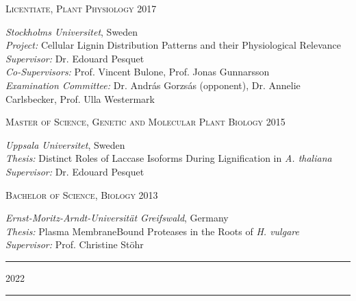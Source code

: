 \documentclass[11pt]{article}
\newcommand*{\xdash}[1][3em]{\rule[0.5ex]{#1}{0.55pt}}
\begin{document}
\begin{addmargin}[15pt]{0pt}
\textsc{\large{Licentiate, Plant Physiology} \hfill \textsc{2017}}
\end{addmargin}
\begin{addmargin}[24pt]{0pt}
	\textit{Stockholms Universitet}, Sweden \\
	\textit{Project:} Cellular Lignin Distribution Patterns and their Physiological Relevance \\
	\textit{Supervisor:} Dr. Edouard Pesquet \\
	\textit{Co-Supervisors:} Prof. Vincent Bulone, Prof. Jonas Gunnarsson\\
	\textit{Examination Committee:} Dr. András Gorzsás (opponent), Dr. Annelie Carlsbecker, Prof. Ulla Westermark
\end{addmargin}
\vspace{0.2cm}

\begin{addmargin}[15pt]{0pt}
\textsc{\large{Master of Science, Genetic and Molecular Plant Biology} \hfill \textsc{2015}}
\end{addmargin}
\begin{addmargin}[24pt]{0pt}
	\textit{Uppsala Universitet}, Sweden \\
	\textit{Thesis:} Distinct Roles of Laccase Isoforms During Lignification in \textit{ A. thaliana}\\
	\textit{Supervisor:} Dr. Edouard Pesquet
\end{addmargin}
\vspace{0.2cm}

\begin{addmargin}[15pt]{0pt}
\textsc{\large{Bachelor of Science, Biology} \hfill \textsc{2013}}
\end{addmargin}
\begin{addmargin}[24pt]{0pt}
	\textit{Ernst-Moritz-Arndt-Universität Greifswald}, Germany \\
	\textit{Thesis:} Plasma Membrane\textendash Bound Proteases in the Roots of \textit{H. vulgare}\\
	\textit{Supervisor:} Prof. Christine Stöhr
\end{addmargin}
\vspace{0.5cm}

\newpage


\hspace*{\fill} \xdash[6em] \large{\textsc{2022}} \xdash[6em] \hspace*{\fill} \normalsize
\end{document}

